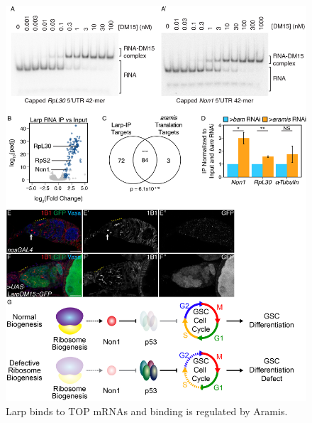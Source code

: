 \documentclass[12pt,oneside]{reedthesis}
\begin{document}
\begin{figure}

{\centering \includegraphics[width=6.5 in,height=8.9375 in]{./figure/Ribosome Biogenesis/Ribosome Biogenesis 7} 

}

\caption[RNA helicases Aramis, Athos and Porthos are required for GSC differentiation.]{Larp binds to TOP mRNAs and binding is regulated by Aramis.}\label{fig:unnamed-chunk-18}
\end{figure}
\end{document}
